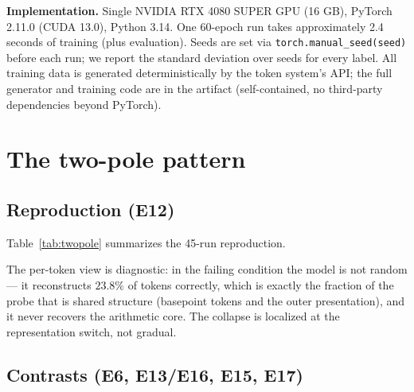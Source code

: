 \documentclass{article} %
\begin{document}
\textbf{Implementation.} Single NVIDIA RTX 4080 SUPER GPU (16 GB),
PyTorch 2.11.0 (CUDA 13.0), Python 3.14. One 60-epoch run takes
approximately 2.4 seconds of training (plus evaluation). Seeds are
set via \texttt{torch.manual\_seed(seed)} before each run; we
report the standard deviation over seeds for every label. All
training data is generated deterministically by the token system's
API; the full generator and training code are in the artifact
(self-contained, no third-party dependencies beyond PyTorch).

\section{The two-pole pattern}

\subsection{Reproduction (E12)}

Table~\ref{tab:twopole} summarizes the 45-run reproduction.

\begin{table}[h]
\centering
\small
{}
\caption{Two-pole OOD pattern (E12, 45 runs). Per-token OOD is the
mean over the 15 runs of each condition; sequence-level OOD is the
aggregate count.}
\label{tab:twopole}
\end{table}

The per-token view is diagnostic: in the failing condition the model
is not random --- it reconstructs $23.8\%$ of tokens correctly,
which is exactly the fraction of the probe that is shared structure
(basepoint tokens and the outer presentation), and it never
recovers the arithmetic core. The collapse is localized at the
representation switch, not gradual.

\subsection{Contrasts (E6, E13/E16, E15, E17)}
\end{document}
